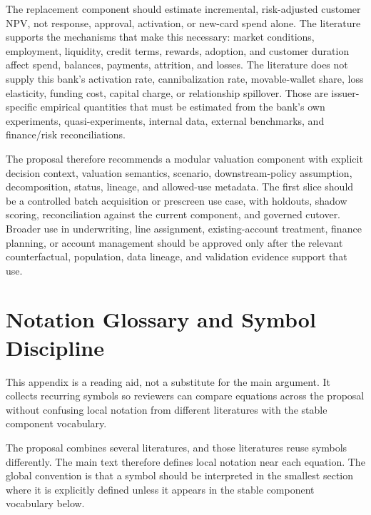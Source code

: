 \documentclass[11pt]{article}
\newcommand{\1}{\mathbf{1}}
\begin{document}
The replacement component should estimate incremental, risk-adjusted customer
NPV, not response, approval, activation, or new-card spend alone. The
literature supports the mechanisms that make this necessary: market
conditions, employment, liquidity, credit terms, rewards, adoption, and
customer duration affect spend, balances, payments, attrition, and losses. The
literature does not supply this bank's activation rate, cannibalization rate,
movable-wallet share, loss elasticity, funding cost, capital charge, or
relationship spillover. Those are issuer-specific empirical quantities that
must be estimated from the bank's own experiments, quasi-experiments, internal
data, external benchmarks, and finance/risk reconciliations.

The proposal therefore recommends a modular valuation component with explicit
decision context, valuation semantics, scenario, downstream-policy assumption,
decomposition, status, lineage, and allowed-use metadata. The first slice
should be a controlled batch acquisition or prescreen use case, with holdouts,
shadow scoring, reconciliation against the current component, and governed
cutover. Broader use in underwriting, line assignment, existing-account
treatment, finance planning, or account management should be approved only
after the relevant counterfactual, population, data lineage, and validation
evidence support that use.

\appendix

\section{Notation Glossary and Symbol Discipline}
\label{sec:notation-glossary}

This appendix is a reading aid, not a substitute for the main argument. It
collects recurring symbols so reviewers can compare equations across the
proposal without confusing local notation from different literatures with the
stable component vocabulary.

The proposal combines several literatures, and those literatures reuse symbols
differently. The main text therefore defines local notation near each equation.
The global convention is that a symbol should be interpreted in the smallest
section where it is explicitly defined unless it appears in the stable
component vocabulary below.
\end{document}
